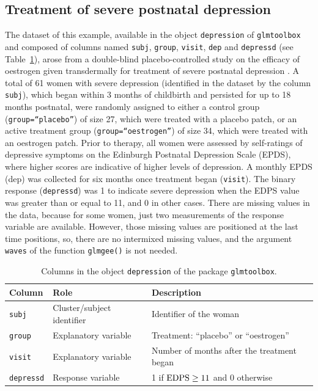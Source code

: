 \subsection{Treatment of severe postnatal depression}
The dataset of this example, available in the object {\tt depression} of {\tt glmtoolbox} and composed of columns named {\tt subj}, {\tt group}, {\tt visit}, {\tt dep} and {\tt depressd} (see Table~\ref{td}), arose from a double-blind placebo-controlled study on the efficacy of oestrogen given transdermally for treatment of severe postnatal depression \citep{GKES96}. A total of 61 women with severe depression (identified in the dataset by the column {\tt subj}), which began within 3 months of childbirth and persisted for up to 18 months postnatal, were randomly assigned to either a control group ({\tt group=``placebo''}) of size 27, which were treated with a placebo patch, or an active treatment group ({\tt group=``oestrogen''}) of size 34, which were treated with an oestrogen patch. Prior to therapy, all women were assessed by self-ratings of depressive symptoms on the Edinburgh Postnatal Depression Scale (EPDS), where higher scores are indicative of higher levels of depression. A monthly EPDS (dep) was collected for six months once treatment began ({\tt visit}). The binary response ({\tt depressd}) was 1 to indicate severe depression when the EDPS value was greater than or equal to 11, and 0 in other cases. There are missing values in the data, because for some women, just two measurements of the response variable are available. However, those missing values are positioned at the last time positions, so, there are no intermixed missing values, and the argument {\tt waves} of the function {\tt glmgee()} is not needed. 

\begin{table}[!ht]
{\small
\begin{center}
\begin{tabular}{lll} 
 \hline
Column &  Role   &  Description\\ \hline
{\tt subj}  & Cluster/subject identifier & Identifier of the woman\\
{\tt group} & Explanatory variable & Treatment: ``placebo'' or ``oestrogen''\\
{\tt visit} & Explanatory variable & Number of months after the treatment began\\
{\tt depressd} & Response variable& 1 if ${\rm EDPS}\geq 11$ and 0 otherwise\\ 
 \hline
\end{tabular}
\end{center}
\caption{Columns in the object {\tt depression} of the package {\tt glmtoolbox}.}
\label{td}}
\end{table}

